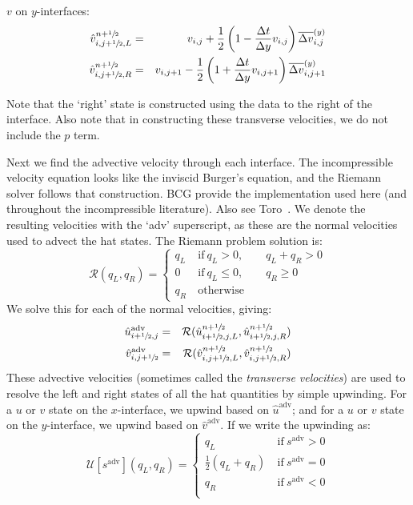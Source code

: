 \noindent $v$ on $y$-interfaces:
\begin{eqnarray}
\hat{v}_{i,j+\myhalf,L}^{n+\myhalf} &=&
   v_{i,j} + \frac{1}{2} \left ( 1 - \frac{\Delta t}{\Delta y} v_{i,j} \right )
       \Dvy_{i,j} \\ 
%
\hat{v}_{i,j+\myhalf,R}^{n+\myhalf} &=&
   v_{i,j+1} - \frac{1}{2} \left ( 1 + \frac{\Delta t}{\Delta y} v_{i,j+1} \right )
       \Dvy_{i,j+1} 
\end{eqnarray}

Note that the `right' state is constructed using the data to the right
of the interface.  Also note that in constructing these transverse
velocities, we do not include the $p$ term.

Next we find the advective velocity through each interface.  
The incompressible
velocity equation looks like the inviscid Burger's equation, and the
Riemann solver follows that construction.  BCG provide the implementation
used here (and throughout the incompressible literature).  Also see Toro~\cite{toro:1997}.
We denote the resulting velocities with the `adv' superscript, as these
are the normal velocities used to advect the hat states.  The Riemann
problem solution is:
\begin{equation}
\mathcal{R}(q_L,q_R) = \left \{ \begin{array}{cl}
   q_L  & \mathrm{~if~} q_L > 0, \qquad q_L + q_R > 0 \\
   0          & \mathrm{~if~} q_L \le 0, \qquad q_R \ge 0 \\
   q_R  & \mathrm{~otherwise}
  \end{array}
  \right .
\end{equation}
We solve this for each of the normal velocities, giving:
\begin{eqnarray}
\hat{u}^\mathrm{adv}_{i+\myhalf,j} &=& 
    \mathcal{R}(\hat{u}_{i+\myhalf,j,L}^{n+\myhalf}, \hat{u}_{i+\myhalf,j,R}^{n+\myhalf}) \\
%
\hat{v}^\mathrm{adv}_{i,j+\myhalf} &=& 
    \mathcal{R}(\hat{v}_{i,j+\myhalf,L}^{n+\myhalf}, \hat{v}_{i,j+\myhalf,R}^{n+\myhalf})
\end{eqnarray}
These advective velocities (sometimes called the {\em transverse
  velocities}) are used to resolve the left and right states of all the
hat quantities by simple upwinding.  For a $u$ or $v$ state on the
$x$-interface, we upwind based on $\hat{u}^\mathrm{adv}$; and for a
$u$ or $v$ state on the $y$-interface, we upwind based on
$\hat{v}^\mathrm{adv}$.  If we write the upwinding as:
\begin{equation}
\mathcal{U}[s^\mathrm{adv}](q_L, q_R) =
  \left \{
  \begin{array}{cl}
  q_L                    & \mathrm{~if~} s^\mathrm{adv} > 0 \\
  \frac{1}{2}(q_L + q_R) & \mathrm{~if~} s^\mathrm{adv} = 0 \\
  q_R                    & \mathrm{~if~} s^\mathrm{adv} < 0 \\
  \end{array}
  \right .
\end{equation}
